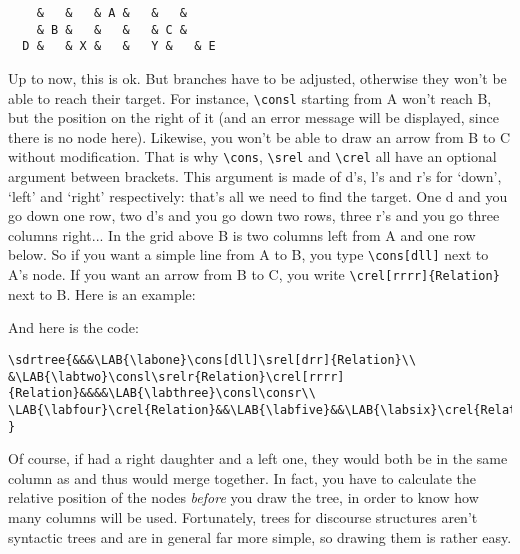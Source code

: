 \documentclass[a4paper]{article}
\begin{document}
\large
\begin{verbatim}
    &   &   & A &   &   &
    & B &   &   &   & C &
  D &   & X &   &	Y &   & E
\end{verbatim}
\normalsize
Up to now, this is ok. But branches have to be adjusted, otherwise they won't be able to reach their target. For instance, \verb+\consl+ starting from A won't reach B, but the position on the right of it (and an error message will be displayed, since there is no node here). Likewise, you won't be able to draw an arrow from B to C without modification. That is why \verb+\cons+, \verb+\srel+ and \verb+\crel+ all have an optional argument between brackets. This argument is made of d's, l's and r's for `down', `left' and `right' respectively: that's all we need to find the target. One d and you go down one row, two d's and you go down two rows, three r's and you go three columns right... In the grid above B is two columns left from A and one row below. So if you want a simple line from A to B, you type \verb+\cons[dll]+ next to A's node. If you want an arrow from B to C, you write \verb+\crel[rrrr]{Relation}+ next to B. Here is an example:
\begin{center}
\end{center}
And here is the code:
\begin{verbatim}
\sdrtree{&&&\LAB{\labone}\cons[dll]\srel[drr]{Relation}\\
&\LAB{\labtwo}\consl\srelr{Relation}\crel[rrrr]{Relation}&&&&\LAB{\labthree}\consl\consr\\
\LAB{\labfour}\crel{Relation}&&\LAB{\labfive}&&\LAB{\labsix}\crel{Relation}&&\LAB{\labseven}\\
}
\end{verbatim}
Of course, if  had a right daughter and  a left one, they would both be in the same column as  and thus would merge together. In fact, you have to calculate  the relative position of the nodes \emph{before} you draw the tree, in order to know how many columns will be used. Fortunately, trees for discourse structures aren't syntactic trees and are in general far more simple, so drawing them is rather easy. 
\end{document}
